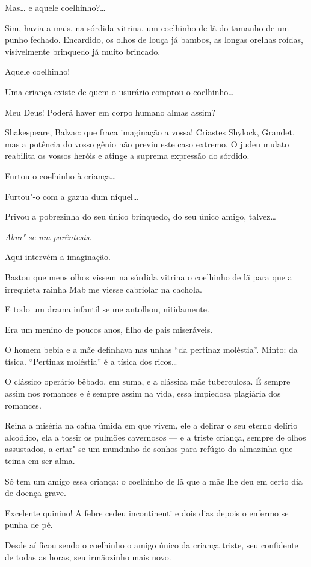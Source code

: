 Mas\ldots{} e aquele coelhinho?\ldots{}

Sim, havia a mais, na sórdida vitrina, um coelhinho de lã do tamanho de
um punho fechado. Encardido, os olhos de louça já bambos, as longas
orelhas roídas, visivelmente brinquedo já muito brincado.

Aquele coelhinho!

Uma criança existe de quem o usurário comprou o coelhinho\ldots{}

Meu Deus! Poderá haver em corpo humano almas assim?

Shakespeare, Balzac: que fraca imaginação a vossa! Criastes Shylock,
Grandet, mas a potência do vosso gênio não previu este caso extremo. O
judeu mulato reabilita os vossos heróis e atinge a suprema expressão do
sórdido.

Furtou o coelhinho à criança\ldots{}

Furtou"-o com a gazua dum níquel\ldots{}

Privou a pobrezinha do seu único brinquedo, do seu único amigo,
talvez\ldots{}

\emph{Abra"-se um parêntesis.}

Aqui intervém a imaginação.

Bastou que meus olhos vissem na sórdida vitrina o coelhinho de lã para
que a irrequieta rainha Mab me viesse cabriolar na cachola.

E todo um drama infantil se me antolhou, nitidamente.

Era um menino de poucos anos, filho de pais miseráveis.

O homem bebia e a mãe definhava nas unhas ``da pertinaz moléstia''.
Minto: da tísica. ``Pertinaz moléstia'' é a tísica dos ricos\ldots{}

O clássico operário bêbado, em suma, e a clássica mãe tuberculosa. É
sempre assim nos romances e é sempre assim na vida, essa impiedosa
plagiária dos romances.

Reina a miséria na cafua úmida em que vivem, ele a delirar o seu eterno
delírio alcoólico, ela a tossir os pulmões cavernosos --- e a triste
criança, sempre de olhos assustados, a criar"-se um mundinho de sonhos
para refúgio da almazinha que teima em ser alma.

Só tem um amigo essa criança: o coelhinho de lã que a mãe lhe deu em
certo dia de doença grave.

Excelente quinino! A febre cedeu incontinenti e dois dias depois o
enfermo se punha de pé.

Desde aí ficou sendo o coelhinho o amigo único da criança triste, seu
confidente de todas as horas, seu irmãozinho mais novo.


